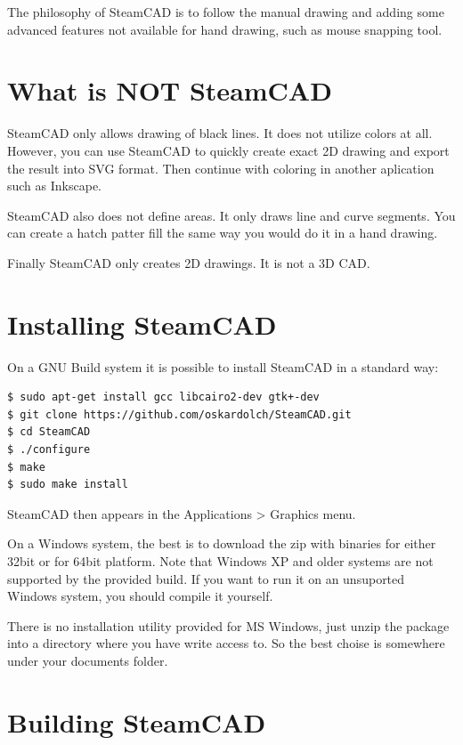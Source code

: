 The philosophy of SteamCAD is to follow the manual drawing and adding some advanced features
not available for hand drawing, such as mouse snapping tool.

\section{What is NOT SteamCAD}

SteamCAD only allows drawing of black lines. It does not utilize colors at all. However, you can
use SteamCAD to quickly create exact 2D drawing and export the result into SVG format. Then
continue with coloring in another aplication such as Inkscape.

SteamCAD also does not define areas. It only draws line and curve segments. You can create a
hatch patter fill the same way you would do it in a hand drawing.

Finally SteamCAD only creates 2D drawings. It is not a 3D CAD.

\section{Installing SteamCAD}

On a GNU Build system it is possible to install SteamCAD in a standard way:
\begin{verbatim}
$ sudo apt-get install gcc libcairo2-dev gtk+-dev
$ git clone https://github.com/oskardolch/SteamCAD.git
$ cd SteamCAD
$ ./configure
$ make
$ sudo make install
\end{verbatim}

SteamCAD then appears in the Applications > Graphics menu.

On a Windows system, the best is to download the zip with binaries for either 32bit or for 64bit
platform. Note that Windows XP and older systems are not supported by the provided build. If
you want to run it on an unsuported Windows system, you should compile it yourself.

There is no installation utility provided for MS Windows, just unzip the package into a directory
where you have write access to. So the best choise is somewhere under your documents folder.

\section{Building SteamCAD}

